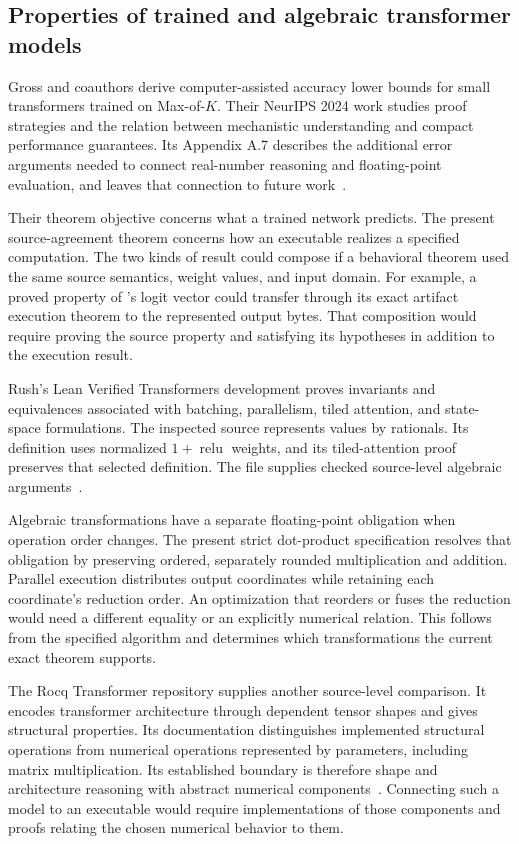 \subsection{Properties of trained and algebraic transformer models}

Gross and coauthors derive computer-assisted accuracy lower bounds for small transformers trained on Max-of-$K$.  Their NeurIPS 2024 work studies proof strategies and the relation between mechanistic understanding and compact performance guarantees.  Its Appendix A.7 describes the additional error arguments needed to connect real-number reasoning and floating-point evaluation, and leaves that connection to future work~\cite{lit-gross}.

Their theorem objective concerns what a trained network predicts.  The present source-agreement theorem concerns how an executable realizes a specified computation.  The two kinds of result could compose if a behavioral theorem used the same source semantics, weight values, and input domain.  For example, a proved property of 's logit vector could transfer through its exact artifact execution theorem to the represented output bytes.  That composition would require proving the source property and satisfying its hypotheses in addition to the execution result.

Rush's Lean Verified Transformers development proves invariants and equivalences associated with batching, parallelism, tiled attention, and state-space formulations.  The inspected source represents values by rationals.  Its  definition uses normalized $1+\operatorname{relu}$ weights, and its tiled-attention proof preserves that selected definition.  The file supplies checked source-level algebraic arguments~\cite{lit-rush}.

Algebraic transformations have a separate floating-point obligation when operation order changes.  The present strict dot-product specification resolves that obligation by preserving ordered, separately rounded multiplication and addition.  Parallel execution distributes output coordinates while retaining each coordinate's reduction order.  An optimization that reorders or fuses the reduction would need a different equality or an explicitly numerical relation.  This follows from the specified algorithm and determines which transformations the current exact theorem supports.

The Rocq Transformer repository supplies another source-level comparison.  It encodes transformer architecture through dependent tensor shapes and gives structural properties.  Its documentation distinguishes implemented structural operations from numerical operations represented by parameters, including matrix multiplication.  Its established boundary is therefore shape and architecture reasoning with abstract numerical components~\cite{lit-rocq}.  Connecting such a model to an executable would require implementations of those components and proofs relating the chosen numerical behavior to them.

